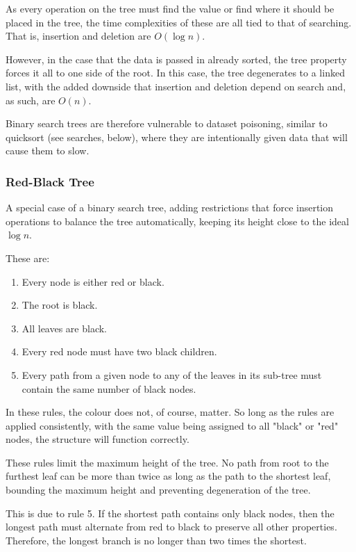 \documentclass[]{article}
\begin{document}
As every operation on the tree must find the value or find where it should be placed in the tree, the time complexities of these are all tied to that of searching. That is, insertion and deletion are $O(\log{n})$.

However, in the case that the data is passed in already sorted, the tree property forces it all to one side of the root. In this case, the tree degenerates to a linked list, with the added downside that insertion and deletion depend on search and, as such, are $O(n)$.

Binary search trees are therefore vulnerable to dataset poisoning, similar to quicksort (see searches, below), where they are intentionally given data that will cause them to slow.

\subsubsection{Red-Black Tree}

A special case of a binary search tree, adding restrictions that force insertion operations to balance the tree automatically, keeping its height close to the ideal $\log{n}$.

These are:

\begin{enumerate}
	\item Every node is either red or black.
	\item The root is black.
	\item All leaves are black. 
	\item Every red node must have two black children.
	\item Every path from a given node to any of the leaves in its sub-tree must contain the same number of black nodes.
\end{enumerate}

In these rules, the colour does not, of course, matter. So long as the rules are applied consistently, with the same value being assigned to all "black" or "red" nodes, the structure will function correctly.

These rules limit the maximum height of the tree. No path from root to the furthest leaf can be more than twice as long as the path to the shortest leaf, bounding the maximum height and preventing degeneration of the tree.

This is due to rule 5. If the shortest path contains only black nodes, then the longest path must alternate from red to black to preserve all other properties. Therefore, the longest branch is no longer than two times the shortest.
\end{document}
